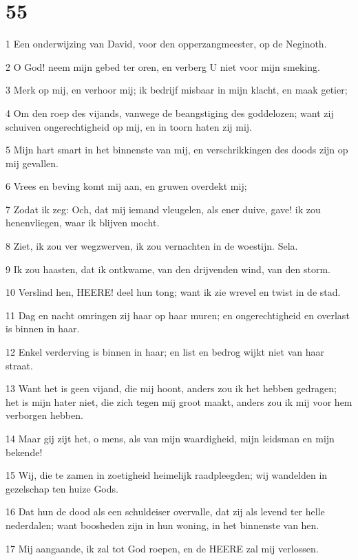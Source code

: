 \chapter{55}

\par 1 Een onderwijzing van David, voor den opperzangmeester, op de Neginoth.
\par 2 O God! neem mijn gebed ter oren, en verberg U niet voor mijn smeking.
\par 3 Merk op mij, en verhoor mij; ik bedrijf misbaar in mijn klacht, en maak getier;
\par 4 Om den roep des vijands, vanwege de beangstiging des goddelozen; want zij schuiven ongerechtigheid op mij, en in toorn haten zij mij.
\par 5 Mijn hart smart in het binnenste van mij, en verschrikkingen des doods zijn op mij gevallen.
\par 6 Vrees en beving komt mij aan, en gruwen overdekt mij;
\par 7 Zodat ik zeg: Och, dat mij iemand vleugelen, als ener duive, gave! ik zou henenvliegen, waar ik blijven mocht.
\par 8 Ziet, ik zou ver wegzwerven, ik zou vernachten in de woestijn. Sela.
\par 9 Ik zou haasten, dat ik ontkwame, van den drijvenden wind, van den storm.
\par 10 Verslind hen, HEERE! deel hun tong; want ik zie wrevel en twist in de stad.
\par 11 Dag en nacht omringen zij haar op haar muren; en ongerechtigheid en overlast is binnen in haar.
\par 12 Enkel verderving is binnen in haar; en list en bedrog wijkt niet van haar straat.
\par 13 Want het is geen vijand, die mij hoont, anders zou ik het hebben gedragen; het is mijn hater niet, die zich tegen mij groot maakt, anders zou ik mij voor hem verborgen hebben.
\par 14 Maar gij zijt het, o mens, als van mijn waardigheid, mijn leidsman en mijn bekende!
\par 15 Wij, die te zamen in zoetigheid heimelijk raadpleegden; wij wandelden in gezelschap ten huize Gods.
\par 16 Dat hun de dood als een schuldeiser overvalle, dat zij als levend ter helle nederdalen; want boosheden zijn in hun woning, in het binnenste van hen.
\par 17 Mij aangaande, ik zal tot God roepen, en de HEERE zal mij verlossen.
